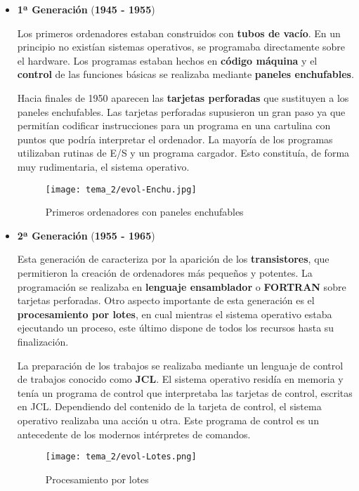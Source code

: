 \begin{itemize}
    \item \textbf{1ª Generación} (\textbf{1945 - 1955})

    Los primeros ordenadores estaban construidos con \textbf{tubos de vacío}. En un principio no existían sistemas operativos, se programaba directamente sobre el hardware. Los programas estaban hechos en \textbf{código máquina} y el \textbf{control} de las funciones básicas se realizaba mediante \textbf{paneles enchufables}.

    Hacia finales de 1950 aparecen las \textbf{tarjetas perforadas} que sustituyen a los paneles enchufables. Las tarjetas perforadas supusieron un gran paso ya que permitían codificar instrucciones para un programa en una cartulina con puntos que podría interpretar el ordenador. La mayoría de los programas utilizaban rutinas de E/S y un programa cargador. Esto constituía, de forma muy rudimentaria, el sistema operativo.

    \begin{figure}[ht]
        \centering
        \texttt{[image: tema\_2/evol-Enchu.jpg]}
        \caption{Primeros ordenadores con paneles enchufables}
    \end{figure}

    \item \textbf{2ª Generación} (\textbf{1955 - 1965})

    Esta generación de caracteriza por la aparición de los \textbf{transistores}, que permitieron la creación de ordenadores más pequeños y potentes. La programación se realizaba en \textbf{lenguaje ensamblador} o \textbf{FORTRAN} sobre tarjetas perforadas. Otro aspecto importante de esta generación es el \textbf{procesamiento por lotes}, en cual mientras el sistema operativo estaba ejecutando un proceso, este último dispone de todos los recursos hasta su finalización.

    La preparación de los trabajos se realizaba mediante un lenguaje de control de trabajos conocido como \textbf{JCL}. El sistema operativo residía en memoria y tenía un programa de control que interpretaba las tarjetas de control, escritas en JCL. Dependiendo del contenido de la tarjeta de control, el sistema operativo realizaba una acción u otra. Este programa de control es un antecedente de los modernos intérpretes de comandos.

      \begin{figure}[ht]
        \centering
        \texttt{[image: tema\_2/evol-Lotes.png]}
        \caption{Procesamiento por lotes}
    \end{figure}
\end{itemize}




\glsaddall
\printglossaries


\newpage
{}



